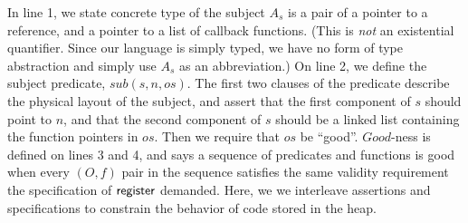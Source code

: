 \documentclass[preprint,natbib]{sigplanconf}
\begin{document}
In line 1, we state concrete type of the subject $A_s$ is a pair of a
pointer to a reference, and a pointer to a list of callback
functions. (This is \emph{not} an existential quantifier.  Since our
language is simply typed, we have no form of type abstraction and
simply use $A_s$ as an abbreviation.)  On line 2, we define
the subject predicate, $sub(s,n,os)$. The first two clauses of the
predicate describe the physical layout of the subject, and assert that
the first component of $s$ should point to $n$, and that the second
component of $s$ should be a linked list containing the function
pointers in $os$.
Then we require that $os$ be ``good''. $Good$-ness is defined on lines
3 and 4, and says a sequence of predicates and functions is good when
every $(O,f)$ pair in the sequence satisfies the same validity
requirement the specification of $\mbox{\textsf{{register}}}$ demanded. Here, we
we interleave assertions and specifications to constrain the behavior
of code stored in the heap.
\end{document}
